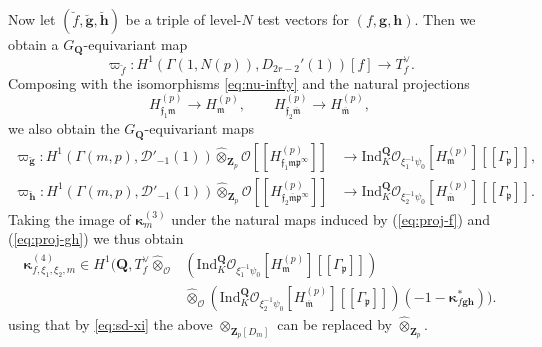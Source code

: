 \documentclass[10pt,letterpaper]{amsart}
\theoremstyle{plain}
\theoremstyle{definition}
\theoremstyle{definition}
\theoremstyle{plain}
\theoremstyle{plain}
\theoremstyle{plain}
\theoremstyle{remark}
\numberwithin{equation}{section}
\newcommand{\ch}{\xi}
\newcommand{\pp}{\mathfrak{p}}
\newcommand{\fkm}{\mathfrak{m}}
\newcommand{\fkmbar}{\overline{\mathfrak{m}}}
\newcommand{\fkf}{\mathfrak{f}}
\newcommand{\bQ}{\mathbf{Q}}
\def\cO{\mathcal O}
\newcommand{\Q}{\mathbf{Q}}
\newcommand{\Z}{\mathbf{Z}}
\newcommand{\bfg}{{\boldsymbol{g}}}
\newcommand{\bfh}{{\boldsymbol{h}}}
\begin{document}
Now let $(\breve{f},\breve{\bfg},\breve{\bfh})$ be a triple of level-$N$ test vectors for $(f,\bfg,\bfh)$. Then we obtain a $G_\Q$-equivariant map
\begin{equation}\label{eq:proj-f}
\varpi_{\breve{f}}:H^1(\Gamma(1,N(p)),D_{2r-2}'(1))[f]\rightarrow T_f^\vee.
\end{equation}
Composing with the isomorphisms \eqref{eq:nu-infty} and the natural projections \[H_{\fkf_1\fkm}^{(p)}\rightarrow H_{\fkm}^{(p)},\qquad H_{\fkf_2\fkmbar}^{(p)}\rightarrow H_{\fkmbar}^{(p)},\] we also obtain the $G_\bQ$-equivariant maps
\begin{equation}\label{eq:proj-gh}
\begin{aligned}
\varpi_{\breve{\bfg}}:H^1(\Gamma(m,p),\mathcal{D}'_{-1}(1))\hat\otimes_{\Z_p}\cO[\![H_{\fkf_1\fkm\pp^\infty}^{(p)}]\!]&\rightarrow{\mathrm{Ind}}_{K}^\Q\cO_{\ch_1^{-1}\psi_0}[H_\fkm^{(p)}][\![\Gamma_\pp]\!],\\
\varpi_{\breve{\bfh}}:H^1(\Gamma(m,p),\mathcal{D}'_{-1}(1))\hat\otimes_{\Z_p}\cO[\![H_{\fkf_2\fkmbar\pp^\infty}^{(p)}]\!]&\rightarrow{\mathrm{Ind}}_{K}^\Q\cO_{\ch_2^{-1}\psi_0}[H_{\fkmbar}^{(p)}][\![\Gamma_\pp]\!].
\end{aligned}
\end{equation}
Taking the image of $\boldsymbol{\kappa}_{m}^{(3)}$ under the natural maps induced by (\ref{eq:proj-f}) and (\ref{eq:proj-gh})  we thus obtain 
\[\begin{aligned}
\boldsymbol{\kappa}_{f,\xi_1,\xi_2,m}^{(4)}\in H^1\bigl(\Q,T_f^\vee\hat\otimes_{\cO}&({\mathrm{Ind}}_K^\Q\cO_{\ch_1^{-1}\psi_0}[H_{\fkm}^{(p)}][\![\Gamma_\pp]\!])\\ &\hat\otimes_{\cO}({\mathrm{Ind}}_K^\Q\cO_{\ch_2^{-1}\psi_0}[H_{\fkmbar}^{(p)}][\![\Gamma_\pp]\!])(-1-\boldsymbol{\kappa}_{f\bfg\bfh}^*)\bigr).
\end{aligned}
\]
using that by \eqref{eq:sd-xi} the above  $\otimes_{\Z_p[D_m]}$ can be replaced by $\hat\otimes_{\Z_p}$.
\end{document}
